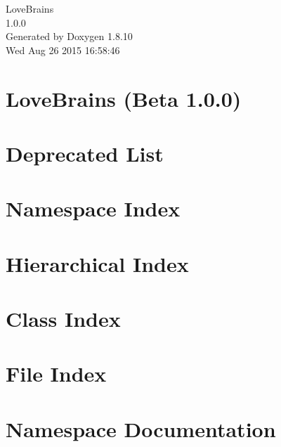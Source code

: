 \documentclass[twoside]{book}
\newcommand{\+}{\discretionary{\mbox{\scriptsize$\hookleftarrow$}}{}{}}
\newcommand{\clearemptydoublepage}{%
  \newpage{\pagestyle{empty}\cleardoublepage}%
}
\begin{document}
\begin{titlepage}
\vspace*{7cm}
\begin{center}%
{\Large Love\+Brains \\[1ex]\large 1.\+0.\+0 }\\
\vspace*{1cm}
{\large Generated by Doxygen 1.8.10}\\
\vspace*{0.5cm}
{\small Wed Aug 26 2015 16:58:46}\\
\end{center}
\end{titlepage}
\clearemptydoublepage
\tableofcontents
\clearemptydoublepage
{}

\chapter{Love\+Brains (Beta 1.0.0)}
\label{md__home_robin_f__programming__git__c_p_p__love_brains__r_e_a_d_m_e}

\chapter{Deprecated List}
\label{deprecated}

\chapter{Namespace Index}

\chapter{Hierarchical Index}

\chapter{Class Index}

\chapter{File Index}

\chapter{Namespace Documentation}







\end{document}
